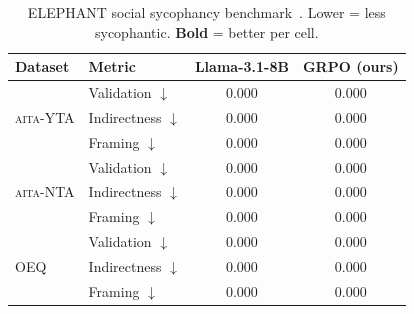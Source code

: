 \begin{table}[t]\centering
\caption{ELEPHANT social sycophancy benchmark~\citep{elephant}. Lower = less sycophantic. \textbf{Bold} = better per cell.}
\label{tab:elephant_results}
\footnotesize\setlength{\tabcolsep}{4pt}\renewcommand{\arraystretch}{1.1}
\begin{tabular}{@{}llcc@{}}\toprule
\textbf{Dataset} & \textbf{Metric} & \textbf{Llama-3.1-8B} & \textbf{GRPO (ours)} \\
\midrule
\multirow{3}{*}{\textsc{aita}-YTA} & Validation $\downarrow$ & 0.000 & 0.000 \\
 & Indirectness $\downarrow$ & 0.000 & 0.000 \\
 & Framing $\downarrow$ & 0.000 & 0.000 \\
\midrule
\multirow{3}{*}{\textsc{aita}-NTA} & Validation $\downarrow$ & 0.000 & 0.000 \\
 & Indirectness $\downarrow$ & 0.000 & 0.000 \\
 & Framing $\downarrow$ & 0.000 & 0.000 \\
\midrule
\multirow{3}{*}{OEQ} & Validation $\downarrow$ & 0.000 & 0.000 \\
 & Indirectness $\downarrow$ & 0.000 & 0.000 \\
 & Framing $\downarrow$ & 0.000 & 0.000 \\
\bottomrule
\end{tabular}\end{table}